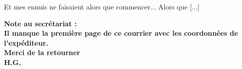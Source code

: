 \documentclass[11pt,twoside,a4paper]{article}
\begin{document}
\begin{minipage}[ht]{0.75\textwidth}
\begin{cursive}
Et mes ennuis ne faisaient alors que commencer... Alors que [...] ~\\
	\end{cursive}
\end{minipage} \hfill \begin{minipage}[ht]{0.20\textwidth}
	\footnotesize	\bfseries
		Note au secr{\'e}tariat :~\\ 
		Il manque la premi{\`e}re page de ce courrier avec les coordonn{\'e}es de l'exp{\'e}diteur. ~\\
		Merci de la retourner~\\
			H.G.~\\
\end{minipage}

\clearpage

\begin{multicols*}{2}



\end{multicols*}
\end{document}

